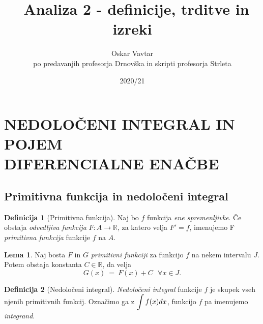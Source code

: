 \documentclass[11pt]{article}
\title{\Left\Homer ~Analiza 2 - definicije, trditve in izreki \Bart}
\author{Oskar Vavtar \\
po predavanjih profesorja Drnovška in skripti profesorja Strleta}
\date{2020/21}
\theoremstyle{definition}
\newtheorem{definicija}{Definicija}[section]
\theoremstyle{definition}
\theoremstyle{definition}
\theoremstyle{theorem}
\newtheorem{lema}{Lema}
\begin{document}
\maketitle
\pagebreak
\tableofcontents
\pagebreak


\section{NEDOLOČENI INTEGRAL IN POJEM \\ DIFERENCIALNE ENAČBE}
\vspace{0.5cm}


\subsection{Primitivna funkcija in nedoločeni integral}
\vspace{0.5cm}

\begin{definicija}[Primitivna funkcija]

Naj bo $f$ funkcija \textit{ene spremenljivke}. Če obstaja \textit{odvedljiva funkcija} $F: A \rightarrow \mathbb{R}$, za katero velja $F' = f$, imenujemo F \textit{primitivna funkcija} funkcije $f$ na $A$. 

\end{definicija}
\vspace{0.5cm}

\begin{lema}

Naj bosta $F$ in $G$ \textit{primitivni funkciji} za funkcijo $f$ na nekem intervalu $J$. Potem obstaja konstanta $C \in \mathbb{R}$, da velja 
$$G(x) ~=~ F(x) + C ~~~ \forall x \in J.$$

\end{lema}
\vspace{0.5cm}

\begin{definicija}[Nedoločeni integral]

\textit{Nedoločeni integral} funkcije $f$ je skupek vseh njenih primitivnih funkcij. Označimo ga z $\mathlarger{\int f(x) dx}$, funkcijo $f$ pa imenujemo \textit{integrand}.

\end{definicija}
\end{document}
